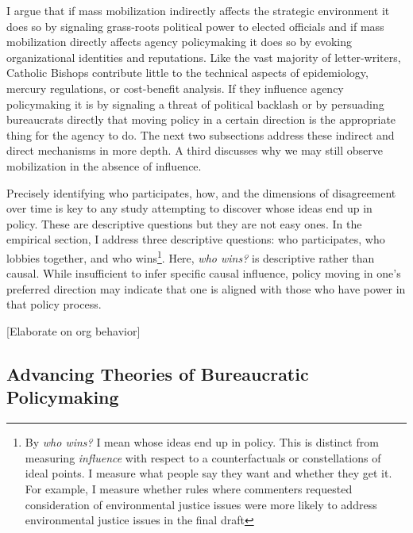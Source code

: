 I argue that if mass mobilization indirectly affects the strategic environment it does so by signaling grass-roots political power to elected officials and if mass mobilization directly affects agency policymaking it does so by evoking organizational identities and reputations. 
Like the vast majority of letter-writers, Catholic Bishops contribute little to the technical aspects of epidemiology, mercury regulations, or cost-benefit analysis. If they influence agency policymaking it is 
by signaling a threat of political backlash or 
by persuading bureaucrats directly that moving policy in a certain direction is the appropriate thing for the agency to do. 
The next two subsections address these indirect and direct mechanisms in more depth. A third discusses why we may still observe mobilization in the absence of influence. 

Precisely identifying who participates, how, and the dimensions of disagreement over time is key to any study attempting to discover whose ideas end up in policy. These are descriptive questions but they are not easy ones. In the empirical section, I address three descriptive questions: who participates, who lobbies together, and who wins\footnote{By \textit{who wins?} I mean whose ideas end up in policy. This is distinct from measuring \textit{influence} with respect to a counterfactuals or constellations of ideal points. I measure what people say they want and whether they get it. For example, I measure whether rules where commenters requested consideration of environmental justice issues were more likely to address environmental justice issues in the final draft}. Here, \textit{who wins?} is descriptive rather than causal. While insufficient to infer specific causal influence, policy moving in one's preferred direction may indicate that one is aligned with those who have power in that policy process. %






[Elaborate on org behavior]

\subsection{Advancing Theories of Bureaucratic Policymaking}

